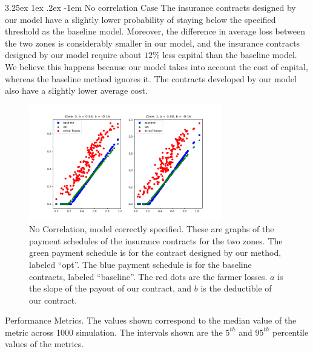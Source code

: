 \documentclass[11pt]{article}
\makeatletter
\renewcommand\paragraph{\@startsection{paragraph}{5}{\z@}%
  {3.25ex \@plus1ex \@minus.2ex}%
  {-1em}%
  {\normalfont\normalsize\bfseries}}
\makeatother
\begin{document}
        \paragraph{No correlation Case} The insurance contracts designed by our model have a slightly lower probability of staying below the specified threshold as the baseline model. Moreover, the difference in average loss between the two zones is considerably smaller in our model, and the insurance contracts designed by our model require about $12\%$ less capital than the baseline model. We believe this happens because our model takes into account the cost of capital, whereas the baseline method ignores it. The contracts developed by our model also have a slightly lower average cost.  
        \begin{figure}[H]
            \centering
            \includegraphics[width=0.75\textwidth]{../../output/figures/Logit_Bootstrap/no_corr_linear_premium.png}
            \caption{No Correlation, model correctly specified. These are graphs of the payment schedules of the insurance contracts for the two zones. The green payment schedule is for the contract designed by our method, labeled ``opt''. The blue payment schedule is for the baseline contracts, labeled ``baseline''. The red dots are the farmer losses. $a$ is the slope of the payout of our contract, and $b$ is the deductible of our contract.}
        \end{figure}

        \begin{table}[H]
            \centering
            
            \caption{Performance Metrics. The values shown correspond to the median value of the metric across 1000 simulation. The intervals shown are the $5^{th}$ and $95^{th}$ percentile values of the metrics.}
        \end{table}
        \FloatBarrier
\end{document}

